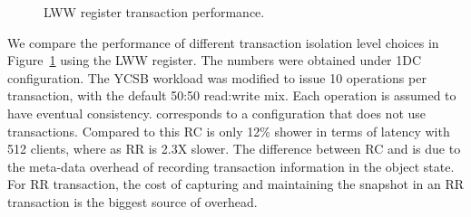 \begin{figure}[t]
  \centering
	\caption{LWW register transaction performance.}
  \label{grf:LWW-txn}
\end{figure}

We compare the performance of different transaction isolation level choices in
Figure~\ref{grf:LWW-txn} using the LWW register. The numbers were obtained
under 1DC configuration. The YCSB workload was modified to issue 10 operations
per transaction, with the default 50:50 read:write mix. Each operation is
assumed to have eventual consistency.  corresponds to a configuration
that does not use transactions. Compared to this RC is only 12\% shower in
terms of latency with 512 clients, where as RR is 2.3X slower. The difference
between RC and  is due to the meta-data overhead of recording
transaction information in the object state. For RR transaction, the cost of
capturing and maintaining the snapshot in an RR transaction is the biggest
source of overhead.

